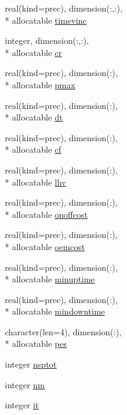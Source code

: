 \begin{DoxyCompactItemize}
real(kind=prec), dimension(\-:,\-:), \\*
allocatable \hyperlink{classplantvar_aade5aa28513690acf2cf215b0dc1acd2}{timevinc}
\item 
integer, dimension(\-:,\-:), \\*
allocatable \hyperlink{classplantvar_a01620e31bb05f1443908f0bff75215a4}{cr}
\item 
real(kind=prec), dimension(\-:), \\*
allocatable \hyperlink{classplantvar_aab06737bb534df1a69fff1f6f601a72a}{pmax}
\item 
real(kind=prec), dimension(\-:), \\*
allocatable \hyperlink{classplantvar_ae10871bcf2f4379bd15a518a314038de}{dt}
\item 
real(kind=prec), dimension(\-:), \\*
allocatable \hyperlink{classplantvar_af0df4533997b17a1fd69f0c152ce2804}{cf}
\item 
real(kind=prec), dimension(\-:), \\*
allocatable \hyperlink{classplantvar_a8c41db489c4d6b494849ab3c82833e29}{lhv}
\item 
real(kind=prec), dimension(\-:), \\*
allocatable \hyperlink{classplantvar_a2e95a86439f2372f77360c8ba1efaaff}{onoffcost}
\item 
real(kind=prec), dimension(\-:), \\*
allocatable \hyperlink{classplantvar_a70a5a58ce085d08a2b8fb1434ab5862c}{oemcost}
\item 
real(kind=prec), dimension(\-:), \\*
allocatable \hyperlink{classplantvar_aa1e10cfba7b7a224f760c1087d2add6d}{minuptime}
\item 
real(kind=prec), dimension(\-:), \\*
allocatable \hyperlink{classplantvar_a9320c1f8ded834439390cb5602c19863}{mindowntime}
\item 
character(len=4), dimension(\-:), \\*
allocatable \hyperlink{classplantvar_a8b75644cc6f0b1728b0fdcd7c575c177}{pes}
\item 
integer \hyperlink{classplantvar_a1301bcb36aec6c118be8c084932de099}{nsptot}
\item 
integer \hyperlink{classplantvar_a137041d7f1c30cc7d248b9ada4feab69}{nm}
\item 
integer \hyperlink{classplantvar_a05f1670af399c966c49b07aa825f279e}{it}
\item 

\end{DoxyCompactItemize}

